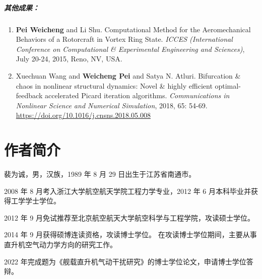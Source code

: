 \documentclass[doctor,openright,twoside,color,AutoFakeBold=true]{buaathesis}
\theoremstyle{plain}
\theoremstyle{definition}
\theoremstyle{plain}
\theoremstyle{plain}
\theoremstyle{remark}
\theoremstyle{remark}
\theoremstyle{definition}
\theoremstyle{plain}
\theoremstyle{definition}
\theoremstyle{plain}
\theoremstyle{plain}
\theoremstyle{remark}
\theoremstyle{plain}
\theoremstyle{definition}
\theoremstyle{remark}
\theoremstyle{plain}
\theoremstyle{remark}
\theoremstyle{definition}
\theoremstyle{plain}
\theoremstyle{plain}
\theoremstyle{definition}
\theoremstyle{plain}
\theoremstyle{plain}
\theoremstyle{definition}
\begin{document}
\paragraph*{其他成果：}
\begin{enumerate}
\item
\textbf{Pei Weicheng} and Li Shu. Computational Method for the Aeromechanical Behaviors of a Rotorcraft in Vortex Ring State. \textit{ICCES (International Conference on Computational \& Experimental Engineering and Sciences)}, July 20-24, 2015, Reno, NV, USA.

\item
Xuechuan Wang and \textbf{Weicheng Pei} and Satya N. Atluri. 
Bifurcation \& chaos in nonlinear structural dynamics: Novel \& highly efficient optimal-feedback accelerated Picard iteration algorithms. \textit{Communications in Nonlinear Science and Numerical Simulation}, 2018, 65: 54-69.\\
\url{https://doi.org/10.1016/j.cnsns.2018.05.008}
\end{enumerate}



\chapter{作者简介}
裴为诚，男，汉族，1989 年 8 月 29 日出生于江苏省南通市。

2008 年 8 月考入浙江大学航空航天学院工程力学专业，2012 年 6 月本科毕业并获得工学学士学位。

2012 年 9 月免试推荐至北京航空航天大学航空科学与工程学院，攻读硕士学位。

2014 年 9 月获得硕博连读资格，攻读博士学位。
在攻读博士学位期间，主要从事直升机空气动力学方向的研究工作。

2022 年完成题为《舰载直升机气动干扰研究》的博士学位论文，申请博士学位答辩。
\end{document}
